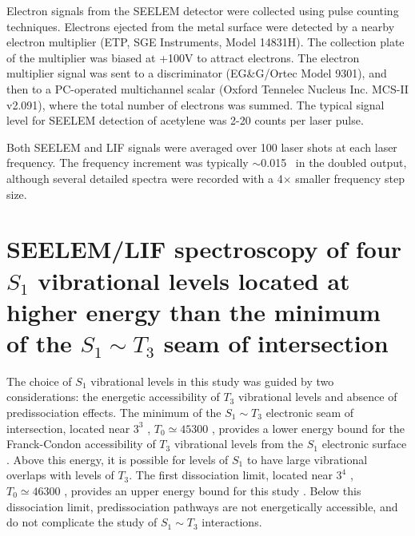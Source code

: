 \documentclass[12pt]{mitthesis}
\begin{document}
Electron signals from the SEELEM detector were collected using pulse
counting techniques.  Electrons ejected from the metal surface were
detected by a nearby electron multiplier (ETP, SGE Instruments, Model
14831H).  The collection plate of the multiplier was biased at +100V
to attract electrons.  The electron multiplier signal was sent to a
discriminator (EG\&G/Ortec Model 9301), and then to a PC-operated
multichannel scalar (Oxford Tennelec Nucleus Inc. MCS-II v2.091),
where the total number of electrons was summed.  The typical signal
level for SEELEM detection of acetylene was 2-20 counts per laser
pulse.

Both SEELEM and LIF signals were averaged over 100 laser shots at each
laser frequency.  The frequency increment was typically $\sim$0.015
\rcm\ in the doubled output, although several detailed spectra were
recorded with a 4$\times$ smaller frequency step size.





























\section{SEELEM/LIF spectroscopy of four $S_1$ vibrational levels
  located at higher energy than the minimum of the $S_1 \sim T_3$ seam
  of intersection}


The choice of $S_1$ vibrational levels in this study was guided by two
considerations: the energetic accessibility of $T_3$ vibrational
levels \cite{cui97, thom07} and absence of predissociation effects.
The minimum of the $S_1 \sim T_3$ electronic seam of intersection,
located near $3^3$ , $T_0 \simeq 45300$ \rcm, provides a lower
energy bound for the Franck-Condon accessibility of $T_3$ vibrational
levels from the $S_1$ electronic surface \cite{cui97}.  Above this
energy, it is possible for levels of $S_1$ to have large vibrational
overlaps with levels of $T_3$.  The first dissociation limit, located
near $3^4$ , $T_0 \simeq 46300$ \rcm, provides an upper energy
bound for this study \cite{mordaunt98}.  Below this dissociation
limit, predissociation pathways are not energetically accessible, and
do not complicate the study of $S_1 \sim T_3$ interactions.
\end{document}
